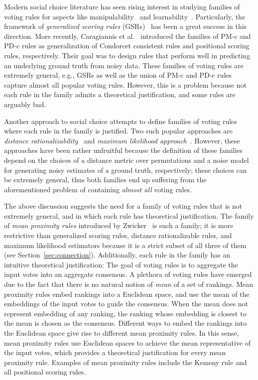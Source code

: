 \documentclass[prodmode,acmec]{ec-acmsmall}
\begin{document}
Modern social choice literature has seen rising interest in studying families of voting rules for aspects like manipulability~\cite{XC08,Xia13} and learnability~\cite{PZR08,PZPR09}. Particularly, the framework of \emph{generalized scoring rules} (GSRs)~\cite{XC08} has been a great success in this direction. More recently, Caragiannis et al.~ introduced the families of PM-c and PD-c rules as generalization of Condorcet consistent rules and positional scoring rules, respectively. Their goal was to design rules that perform well in predicting an underlying ground truth from noisy data. These families of voting rules are extremely general, e.g., GSRs as well as the union of PM-c and PD-c rules capture almost all popular voting rules. However, this is a problem because not each rule in the family admits a theoretical justification, and some rules are arguably bad. 

Another approach to social choice attempts to define families of voting rules where each rule in the family is justified. Two such popular approaches are \emph{distance rationalizability}~\cite{EFS09,elkind2010good} and \emph{maximum likelihood approach}~\cite{CS05b,CRX09}. However, these approaches have been rather unfruitful because the definition of these families depend on the choices of a distance metric over permutations and a noise model for generating noisy estimates of a ground truth, respectively; these choices can be extremely general, thus both families end up suffering from the aforementioned problem of containing \emph{almost all} voting rules.

The above discussion suggests the need for a family of voting rules that is not extremely general, and in which each rule has theoretical justification. The family of \emph{mean proximity rules} introduced by Zwicker~ is such a family; it is more restrictive than generalized scoring rules, distance rationalizable rules, and maximum likelihood estimators because it is a strict subset of all three of them (see Section~\ref{sec:connection}). Additionally, each rule in the family has an intuitive theoretical justification: The goal of voting rules is to aggregate the input votes into an aggregate consensus. A plethora of voting rules have emerged due to the fact that there is no natural notion of \emph{mean} of a set of rankings. Mean proximity rules embed rankings into a Euclidean space, and use the mean of the embeddings of the input votes to guide the consensus. When the mean does not represent embedding of any ranking, the ranking whose embedding is closest to the mean is chosen as the consensus. Different ways to embed the rankings into the Euclidean space give rise to different mean proximity rules. In this sense, mean proximity rules use Euclidean spaces to achieve the mean representative of the input votes, which provides a theoretical justification for every mean proximity rule. Examples of mean proximity rules include the Kemeny rule and all positional scoring rules. 
\end{document}
